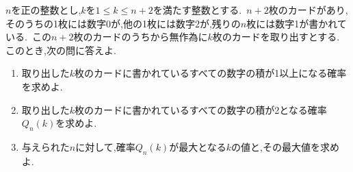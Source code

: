 \begin{problem}
$n$を正の整数とし,$k$を$1 \leq k \leq n+2$を満たす整数とする.\, $n+2$枚のカードがあり,そのうちの1枚には数字0が,他の1枚には数字2が,残りの$n$枚には数字1が書かれている.\, この$n+2$枚のカードのうちから無作為に$k$枚のカードを取り出すとする.\, このとき,次の問に答えよ.
  \begin{enumerate}[(1)\ ]
    \item 取り出した$k$枚のカードに書かれているすべての数字の積が1以上になる確率を求めよ.
    \item 取り出した$k$枚のカードに書かれているすべての数字の積が2となる確率$Q_n(k)$を求めよ.
    \item 与えられた$n$に対して,確率$Q_n(k)$が最大となる$k$の値と,その最大値を求めよ.
  \end{enumerate}
\end{problem}
